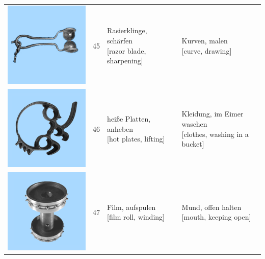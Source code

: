 \documentclass[
  english,
  man,floatsintext]{apa7}
\begin{document}
\begin{center}
\begin{ThreePartTable}
{\begin{longtable}{llll}
\includegraphics[valign=c, scale=0.23]{../materials/unfamiliar/45.png} & 45 & \makecell[l]{Rasierklinge, schärfen\\{[razor blade, sharpening]}} & \makecell[l]{Kurven, malen\\{[curve, drawing]}}\\
\includegraphics[valign=c, scale=0.23]{../materials/unfamiliar/46.png} & 46 & \makecell[l]{heiße Platten, anheben\\{[hot plates, lifting]}} & \makecell[l]{Kleidung, im Eimer waschen\\{[clothes, washing in a bucket]}}\\
\includegraphics[valign=c, scale=0.23]{../materials/unfamiliar/47.png} & 47 & \makecell[l]{Film, aufspulen\\{[film roll, winding]}} & \makecell[l]{Mund, offen halten\\{[mouth, keeping open]}}\\

\end{longtable}}
\end{ThreePartTable}
\end{center}
\end{document}
